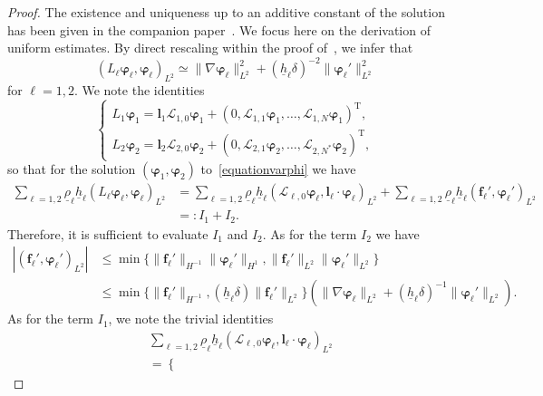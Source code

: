 \documentclass[11pt,leqno]{article}
\numberwithin{equation}{section}
\numberwithin{figure}{section}
\begin{document}
\begin{proof}
The existence and uniqueness up to an additive constant of the solution has been given in the companion 
paper~\cite[Lemma~6.4]{DucheneIguchi2020}. 
We focus here on the derivation of uniform estimates. 
%
By direct rescaling within the proof of~\cite[Lemma~6.1]{DucheneIguchi2020}, we infer that 
%
\[
(L_\ell\bm{\varphi}_\ell,\bm{\varphi}_\ell)_{L^2}
\simeq \|\nabla\bm{\varphi}_\ell\|_{L^2}^2 + (\underline{h}_\ell\delta)^{-2}\|\bm{\varphi}_\ell'\|_{L^2}^2
\]
%
for $\ell=1,2$. 
We note the identities 
%
\[
\begin{cases}
 L_1\bm{\varphi}_1 = \bm{l}_1\mathcal{L}_{1,0}\bm{\varphi}_1
  + (0,\mathcal{L}_{1,1}\bm{\varphi}_1,\ldots,\mathcal{L}_{1,N}\bm{\varphi}_1)^\mathrm{T}, \\
 L_2\bm{\varphi}_2 = \bm{l}_2\mathcal{L}_{2,0}\bm{\varphi}_2
  + (0,\mathcal{L}_{2,1}\bm{\varphi}_2,\ldots,\mathcal{L}_{2,N^*}\bm{\varphi}_2)^\mathrm{T},
\end{cases}
\]
%
so that for the solution $(\bm{\varphi}_1,\bm{\varphi}_2)$ to~\eqref{equationvarphi} we have 
%
\begin{align}\label{EE-identity1}
\sum_{\ell=1,2}\underline{\rho}_\ell\underline{h}_\ell (L_\ell\bm{\varphi}_\ell,\bm{\varphi}_\ell)_{L^2}
&= \sum_{\ell=1,2}\underline{\rho}_\ell\underline{h}_\ell
 (\mathcal{L}_{\ell,0}\bm{\varphi}_\ell,\bm{l}_\ell\cdot\bm{\varphi}_\ell)_{L^2}
 + \sum_{\ell=1,2}\underline{\rho}_\ell\underline{h}_\ell (\bm{f}_\ell',\bm{\varphi}_\ell')_{L^2} \\
&=: I_1+I_2. \nonumber
\end{align}
%
Therefore, it is sufficient to evaluate $I_1$ and $I_2$. 
As for the term $I_2$ we have 
%
\begin{align*}
|(\bm{f}_\ell',\bm{\varphi}_\ell')_{L^2}|
&\leq \min\{ \|\bm{f}_\ell'\|_{H^{-1}}\|\bm{\varphi}_\ell'\|_{H^1}, 
\|\bm{f}_\ell'\|_{L^2}\|\bm{\varphi}_\ell'\|_{L^2} \} \\
&\leq \min\{ \|\bm{f}_\ell'\|_{H^{-1}}, (\underline{h}_\ell\delta)\|\bm{f}_\ell'\|_{L^2} \}
( \|\nabla\bm{\varphi}_\ell\|_{L^2} + (\underline{h}_\ell\delta)^{-1}\|\bm{\varphi}_\ell'\|_{L^2} ).
\end{align*}
%
As for the term $I_1$, we note the trivial identities 
%
\begin{align*}
&\sum_{\ell=1,2}\underline{\rho}_\ell\underline{h}_\ell
 (\mathcal{L}_{\ell,0}\bm{\varphi}_\ell,\bm{l}_\ell\cdot\bm{\varphi}_\ell)_{L^2} \\
&= 
\begin{cases}

\end{cases}
\end{align*}
\end{proof}
\end{document}
